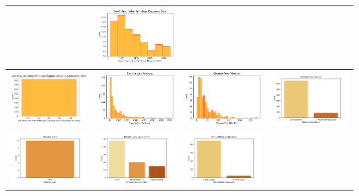 \begin{table}
\begin{center}
\begin{tabular}{ |c|c|c|c| }
			& \includegraphics[width=.25\textwidth]{NOTEBOOK/IMAGENES_CRUDAS/16} 
			\\  \hline
			\includegraphics[width=.25\textwidth]{NOTEBOOK/IMAGENES_CRUDAS/17} 
			& \includegraphics[width=.25\textwidth]{NOTEBOOK/IMAGENES_CRUDAS/18} 
			& \includegraphics[width=.25\textwidth]{NOTEBOOK/IMAGENES_CRUDAS/19} 
			& \includegraphics[width=.25\textwidth]{NOTEBOOK/IMAGENES_CRUDAS/20} 
			\\  \hline
			\includegraphics[width=.25\textwidth]{NOTEBOOK/IMAGENES_CRUDAS/21} 
			& \includegraphics[width=.25\textwidth]{NOTEBOOK/IMAGENES_CRUDAS/22} 
			& \includegraphics[width=.25\textwidth]{NOTEBOOK/IMAGENES_CRUDAS/23} 

\end{tabular}
\end{center}
\end{table}
